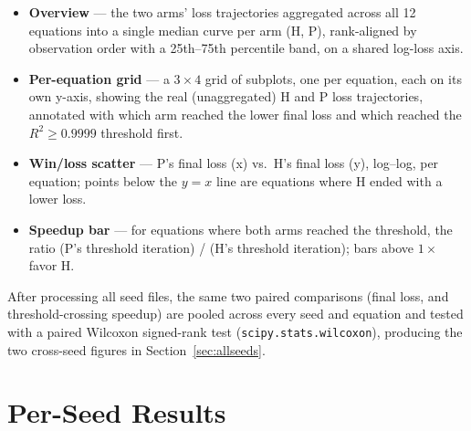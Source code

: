 \documentclass[11pt]{article}
\newcommand{\Rsq}{R^2}
\begin{document}
\begin{itemize}
  \item \textbf{Overview} --- the two arms' loss trajectories aggregated across all 12 equations
    into a single median curve per arm (H, P), rank-aligned by observation order with a 25th--75th
    percentile band, on a shared log-loss axis.
  \item \textbf{Per-equation grid} --- a $3\times4$ grid of subplots, one per equation, each on its
    own y-axis, showing the real (unaggregated) H and P loss trajectories, annotated with which arm
    reached the lower final loss and which reached the $\Rsq\ge0.9999$ threshold first.
  \item \textbf{Win/loss scatter} --- P's final loss (x) vs.\ H's final loss (y), log--log, per
    equation; points below the $y=x$ line are equations where H ended with a lower loss.
  \item \textbf{Speedup bar} --- for equations where both arms reached the threshold, the ratio
    (P's threshold iteration) / (H's threshold iteration); bars above $1\times$ favor H.
\end{itemize}

\noindent After processing all seed files, the same two paired comparisons (final loss, and
threshold-crossing speedup) are pooled across every seed and equation and tested with a paired
Wilcoxon signed-rank test (\texttt{scipy.stats.wilcoxon}), producing the two cross-seed figures in
Section~\ref{sec:allseeds}.

\section{Per-Seed Results}
\label{sec:perseed}

\FloatBarrier
\end{document}
